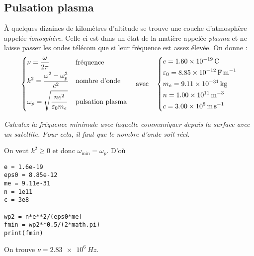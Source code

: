 \subsection{Pulsation plasma}
À quelques dizaines de kilomètres d'altitude se trouve une couche d'atmosphère appelée \emph{ionosphère}. Celle-ci est dans un état de la matière appelée \emph{plasma} et ne laisse passer les ondes télécom que si leur fréquence est assez élevée. On donne :
\begin{align*}
    \begin{dcases}
        \nu=\frac{\omega}{2\pi} & \text{fréquence}\\
        k^2=\frac{\omega^2-\omega_p^2}{c^2} & \text{nombre d'onde}\\
        \omega_p=\sqrt{\frac{ne^2}{\varepsilon_0m_e}} & \text{pulsation plasma}
    \end{dcases}
\quad\text{avec}\quad
    \begin{dcases}
        e=\SI{1,60e-19}{C}\\
        \varepsilon_0=\SI{8,85e-12}{F.m^{-1}}\\
        m_e=\SI{9,11e-31}{kg}\\
        n=\SI{1,00e11}{m^{-3}}\\
        c=\SI{3,00e8}{m.s^{-1}}
    \end{dcases}
\end{align*}
\begin{Exercise}
{\it Calculez la fréquence minimale avec laquelle communiquer depuis la surface avec un satellite. Pour cela, il faut que le nombre d'onde soit réel.
}
\end{Exercise}
\begin{Answer}
On veut $k^2\geqslant 0$ et donc $\omega_\text{min}=\omega_p$. D'où 
\begin{lstlisting}
e = 1.6e-19
eps0 = 8.85e-12
me = 9.11e-31
n = 1e11
c = 3e8

wp2 = n*e**2/(eps0*me)
fmin = wp2**0.5/(2*math.pi)
print(fmin)
\end{lstlisting}

On trouve $\nu=\SI{2,83e6}{Hz}$.
\end{Answer} 
